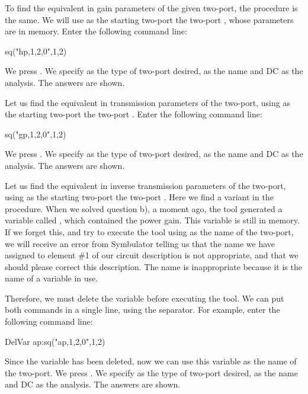 To find the equivalent in gain parameters of the given two-port, the
procedure is the same. We will use as the starting two-port the
two-port , whose parameters are in memory. Enter the
following command line:

\begin{entry}
sq\port("hp,1,2,0",1,2)
\end{entry}

We press . We specify  as the type of two-port
desired,  as the name and DC as the analysis. The answers
are shown.

Let us find the equivalent in transmission parameters of the
two-port, using as the starting two-port the two-port .
Enter the following command line:

\begin{entry}
sq\port("gp,1,2,0",1,2)
\end{entry}

We press . We specify  as the type of two-port
desired,  as the name and DC as the analysis. The answers
are shown.

Let us find the equivalent in inverse transmission parameters of the
two-port, using as the starting two-port the two-port .
Here we find a variant in the procedure. When we solved question b),
a moment ago, the  tool generated a variable called
, which contained the power gain. This variable is still in
memory. If we forget this, and try to execute the tool using
 as the name of the two-port, we will receive an error from
Symbulator telling us that the name we have assigned to element \#1
of our circuit description is not appropriate, and that we should
please correct this description. The name is inappropriate because
it is the name of a variable in use.

Therefore, we must delete the variable before executing the tool. We
can put both commands in a single line, using the separator. For
example, enter the following command line:

\begin{entry}
DelVar ap:sq\port("ap,1,2,0",1,2)
\end{entry}

Since the variable  has been deleted, now we can use this
variable as the name of the two-port. We press . We
specify  as the type of two-port desired,  as the
name and DC as the analysis. The answers are shown.

